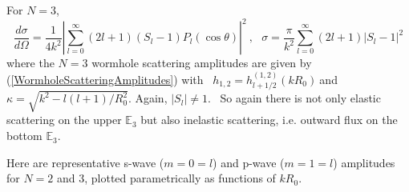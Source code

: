 \documentclass{article}%
\begin{document}
For $N=3$,
\begin{equation}
\frac{d\sigma}{d\Omega}=\frac{1}{4k^{2}}\left\vert \sum_{l=0}^{\infty}\left(
2l+1\right)  \left(  S_{l}-1\right)  P_{l}\left(  \cos\theta\right)
\right\vert ^{2}\ ,\text{ \ \ }\sigma=\frac{\pi}{k^{2}}\sum_{l=0}^{\infty
}\left(  2l+1\right)  \left\vert S_{l}-1\right\vert ^{2}%
\end{equation}
where the $N=3$ wormhole scattering amplitudes are given by
(\ref{WormholeScatteringAmplitudes}) with \ $h_{1,2}=h_{l+1/2}^{\left(
1,2\right)  }\left(  kR_{0}\right)  \ $and $\kappa=\sqrt{k^{2}-l\left(
l+1\right)  /R_{0}^{2}}$. Again, $\left\vert S_{l}\right\vert \neq1$. \ So
again there is not only elastic scattering on the upper $\mathbb{E}_{3}$ but
also inelastic scattering, i.e. outward flux on the bottom $\mathbb{E}_{3}$.

Here are representative s-wave ($m=0=l$) and p-wave ($m=1=l$) amplitudes for
$N=2$ and $3$, plotted parametrically as functions of $kR_{0}$.
\end{document}
